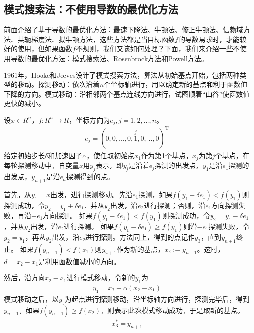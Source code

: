    \subsection{模式搜索法：不使用导数的最优化方法}
        \par
        前面介绍了基于导数的最优化方法：最速下降法、牛顿法、修正牛顿法、信赖域方法、共轭梯度法、拟牛顿方法，这些方法都是当目标函数$f$的导数易求时，才能较好的使用，但如果函数$f$不规则，我们又该如何处理？下面，我们来介绍一些不使用导数的最优化方法：模式搜索法、Rosenbrock方法和Powell方法。
        \par
        1961年，Hooke和Jeeves设计了模式搜索方法，算法从初始基点开始，包括两种类型的移动。探测移动：依次沿着$n$个坐标轴进行，用以确定新的基点和利于函数值下降的方向。模式移动：沿相邻两个基点连线方向进行，试图顺着“山谷”使函数值更快的减小。
        \par
        设$x \in R^n$，$f:R^n \rightarrow R$，坐标方向为$e_j,j=1,2,\ldots,n$。
        \begin{align*}
         e_j=(0,0,\ldots,0,\overset{j}{1},0,\ldots,0)^\mathrm{T}
        \end{align*}
        给定初始步长$\delta$和加速因子$\alpha$，使任取初始点$x_1$作为第1个基点，$x_j$为第$j$个基点，在每轮探测移动中，自变量$x$用$y_j$表示，即$y_j$是沿着$e_j$探测的出发点，$y_1$是沿$e_1$探测的出发点，$y_{n+1}$是沿$e_{n}$探测得到的点。
        \par
        首先，从$y_1=x$出发，进行探测移动。先沿$e_1$探测，如果$f(y_1+\delta e_1)<f(y_1)$则探测成功，令$y_2=y_1+\delta e_1$，并从$y_2$出发，沿$e_2$进行探测；否则，沿$e_1$方向探测失败，再沿$-e_1$方向探测。
        如果$f(y_1-\delta e_1)<f(y_1)$则探测成功，令$y_2=y_1-\delta e_1$，并从$y_2$出发，沿$e_2$进行探测。
        如果$f(y_1-\delta e_1) \geqslant f(y_1)$则沿$-e_1$探测失败，令$y_2=y_1$，再从$y_2$出发，沿$e_2$进行探测。方法同上，得到的点记作$y_3$，直到$y_{n+1}$终止。
        如果$f(y_{n+1}) < f(x_1)$则$y_{n+1}$作为新的基点，$x_2:=y_{n+1}$。这时，$d=x_2-x_1$是利用函数值减小的方向。
        \par
        然后，沿方向$x_2-x_1$进行模式移动，令新的$y_1$为
        \begin{align*}
         y_1=x_2+\alpha(x_2-x_1)
        \end{align*}
        模式移动之后，以$y_1$为起点进行探测移动，沿坐标轴方向进行，探测完毕后，得到$y_{n+1}$，如果$f(y_{n+1}) \geqslant f(x_2)$，则表示此次模式移动成功，于是取新的基点。
        \begin{align*}
         x_3^*=y_{n+1}
        \end{align*}
